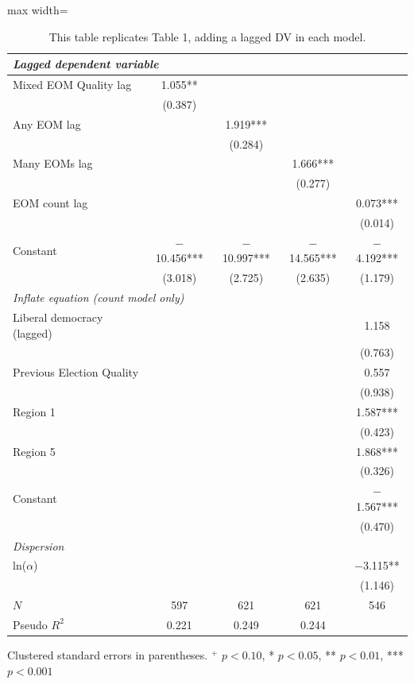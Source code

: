 \documentclass[USletter,12pt, titlepage]{article} %
\begin{document}
\begin{table}[H]
\begin{adjustbox}{max width=\textwidth}
\begin{threeparttable}
\begin{tabular}{lcccc}
\midrule
\multicolumn{5}{l}{\textit{Lagged dependent variable}} \\
\midrule
Mixed EOM Quality lag & 1.055** & & & \\
 & (0.387) & & & \\
Any EOM lag & & 1.919*** & & \\
 & & (0.284) & & \\
Many EOMs lag & & & 1.666*** & \\
 & & & (0.277) & \\
EOM count lag & & & & 0.073*** \\
 & & & & (0.014) \\
\midrule
Constant & $-$10.456*** & $-$10.997*** & $-$14.565*** & $-$4.192*** \\
 & (3.018) & (2.725) & (2.635) & (1.179) \\
\midrule
\multicolumn{5}{l}{\textit{Inflate equation (count model only)}} \\
\midrule
Liberal democracy (lagged) & & & & 1.158 \\
 & & & & (0.763) \\
Previous Election Quality & & & & 0.557 \\
 & & & & (0.938) \\
Region 1 & & & & 1.587*** \\
 & & & & (0.423) \\
Region 5 & & & & 1.868*** \\
 & & & & (0.326) \\
Constant & & & & $-$1.567*** \\
 & & & & (0.470) \\
\midrule
\multicolumn{5}{l}{\textit{Dispersion}} \\
\midrule
ln($\alpha$) & & & & $-$3.115** \\
 & & & & (1.146) \\
\midrule
$N$ & 597 & 621 & 621 & 546 \\
Pseudo $R^{2}$ & 0.221 & 0.249 & 0.244 & \\
\bottomrule
\end{tabular}
\begin{tablenotes}
\small
\item Clustered standard errors in parentheses. $^{+}$ $p<0.10$, * $p<0.05$, ** $p<0.01$, *** $p<0.001$
\end{tablenotes}
\end{threeparttable}
\end{adjustbox}
\vspace{0.5em}
\caption{This table replicates Table 1, adding a lagged DV in each model.}
\end{table}
\end{document}
